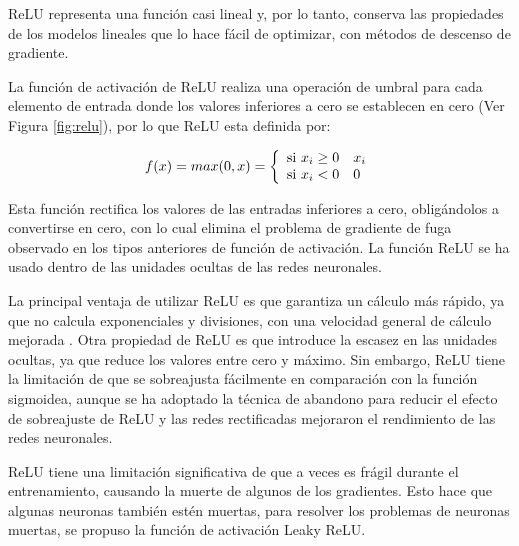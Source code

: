 \vspace{5mm} %

ReLU representa una función casi lineal y, por lo tanto, conserva las propiedades de los modelos lineales que lo hace fácil de optimizar, con métodos de descenso de gradiente.

\vspace{5mm} %

La función de activación de ReLU realiza una operación de umbral para cada elemento de entrada donde los valores inferiores a cero se establecen en cero (Ver Figura \ref{fig:relu}), por lo que ReLU esta definida por:

\begin{equation}
f(x) = max(0,x) = \left\lbrace
\begin{array}{ll}
\textup{si } x_{i}\geq0 & x_{i}\\
\textup{si } x_{i} < 0 & 0
\end{array}
\right.
\end{equation}

Esta función rectifica los valores de las entradas inferiores a cero, obligándolos a convertirse en cero, con lo cual elimina el problema de gradiente de fuga observado en los tipos anteriores de función de activación. La función ReLU se ha usado dentro de las unidades ocultas de las redes neuronales.

\vspace{5mm} %

La principal ventaja de utilizar ReLU es que garantiza un cálculo más rápido, ya que no calcula exponenciales y divisiones, con una velocidad general de cálculo mejorada \cite{45}. Otra propiedad de ReLU es que introduce la escasez en las unidades ocultas, ya que reduce los valores entre cero y máximo. Sin embargo, ReLU tiene la limitación de que se sobreajusta fácilmente en comparación con la función sigmoidea, aunque se ha adoptado la técnica de abandono para reducir el efecto de sobreajuste de ReLU y las redes rectificadas mejoraron el rendimiento de las redes neuronales.

\vspace{5mm} %

ReLU tiene una limitación significativa de que a veces es frágil durante el entrenamiento, causando la muerte de algunos de los gradientes. Esto hace que algunas neuronas también estén muertas, para resolver los problemas de neuronas muertas, se propuso la funci\'{o}n de activaci\'{o}n Leaky ReLU.

